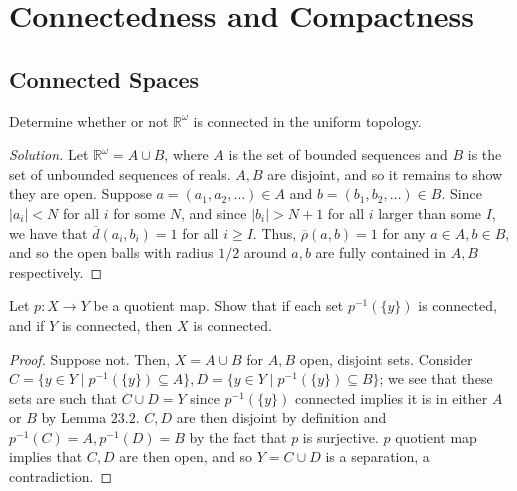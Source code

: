 \documentclass[12pt]{article}
\theoremstyle{remark}
\begin{document}
\section{Connectedness and Compactness}
\setcounter{subsection}{22}
\subsection{Connected Spaces}
\setcounter{subsubsection}{7}
\begin{problem}\label{exc:23.8}
  Determine whether or not $\mathbb{R}^\omega$ is connected in the uniform topology.
\end{problem}
\begin{proof}[Solution]
  Let $\mathbb{R}^\omega = A \cup B$, where $A$ is the set of bounded sequences and $B$ is the set of unbounded sequences of reals. $A,B$ are disjoint, and so it remains to show they are open. Suppose $a = (a_1,a_2,\ldots) \in A$ and $b = (b_1,b_2,\ldots) \in B$. Since $|a_i| < N$ for all $i$ for some $N$, and since $|b_i| > N+1$ for all $i$ larger than some $I$, we have that $\overline{d}(a_i,b_i) = 1$ for all $i \ge I$. Thus, $\overline{\rho}(a,b) = 1$ for any $a \in A, b\in B$, and so the open balls with radius $1/2$ around $a,b$ are fully contained in $A,B$ respectively.
\end{proof}

\setcounter{subsubsection}{10}
\begin{problem}
  Let $p\colon X \to Y$ be a quotient map. Show that if each set $p^{-1}(\{y\})$ is connected, and if $Y$ is connected, then $X$ is connected.
\end{problem}
\begin{proof}
  Suppose not. Then, $X = A \cup B$ for $A,B$ open, disjoint sets. Consider $C =
  \{y \in Y \mid p^{-1}(\{y\}) \subseteq A\}, D = \{y \in Y \mid p^{-1}(\{y\})
\subseteq B\}$; we see that these sets are such that $C \cup D = Y$ since $p^{-1}(\{y\})$ connected implies it is in either $A$ or $B$ by Lemma $23.2$. $C,D$ are then disjoint by definition and $p^{-1}(C) = A, p^{-1}(D) = B$ by the fact that $p$ is surjective. $p$ quotient map implies that $C,D$ are then open, and so $Y = C \cup D$ is a separation, a contradiction.
\end{proof}
\end{document}
